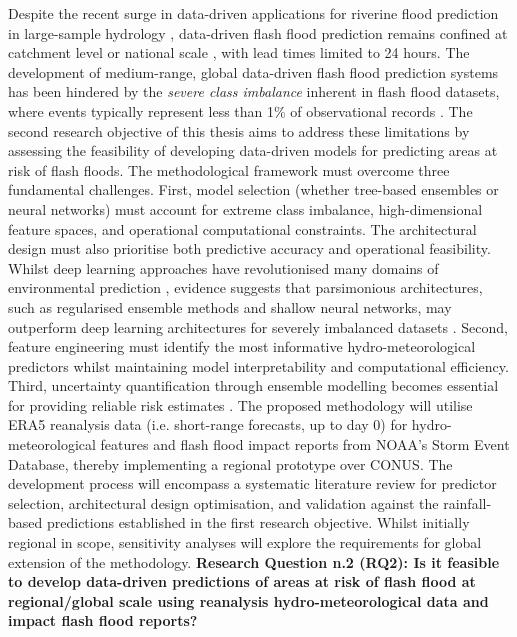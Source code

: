 Despite  the recent surge in data-driven applications for riverine flood prediction in large-sample hydrology \citep{Nearing_2024}, data-driven flash flood prediction remains confined at catchment level \citep{Ding_2025, Zhao_2025, Song_2020, Saleh_2024} or national scale \citep{Zhao_2022}, with lead times limited to 24 hours. The development of medium-range, global data-driven flash flood prediction systems has been hindered by the \textit{severe class imbalance} inherent in flash flood datasets, where events typically represent less than 1\% of observational records \citep{Kratzert_2023, Färber_2024, Panwar_2020, Jonkman_2024}. The second research objective of this thesis aims to address these limitations by assessing the feasibility of developing data-driven models for predicting areas at risk of flash floods. The methodological framework must overcome three fundamental challenges. First, model selection (whether tree-based ensembles or neural networks) must account for extreme class imbalance, high-dimensional feature spaces, and operational computational constraints. The architectural design must also prioritise both predictive accuracy and operational feasibility. Whilst deep learning approaches have revolutionised many domains of environmental prediction \citep{Lang_2024, Nearing_2024}, evidence suggests that parsimonious architectures, such as regularised ensemble methods and shallow neural networks, may outperform deep learning architectures for severely imbalanced datasets \citep{Kumar_2021, Xu_2022, Luo_2025a}.  Second, feature engineering must identify the most informative hydro-meteorological predictors whilst maintaining model interpretability and computational efficiency. Third, uncertainty quantification through ensemble modelling becomes essential for providing reliable risk estimates \citep{Saleh_2024}. The proposed methodology will utilise ERA5 reanalysis data (i.e. short-range forecasts, up to day 0) for hydro-meteorological features and flash flood impact reports from NOAA's Storm Event Database, thereby implementing a regional prototype over CONUS. The development process will encompass a systematic literature review for predictor selection, architectural design optimisation, and validation against the rainfall-based predictions established in the first research objective. Whilst initially regional in scope, sensitivity analyses will explore the requirements for global extension of the methodology. \textbf{Research Question n.2 (RQ2): Is it feasible to develop data-driven predictions of areas at risk of flash flood at regional/global scale using reanalysis hydro-meteorological data and impact flash flood reports?}

